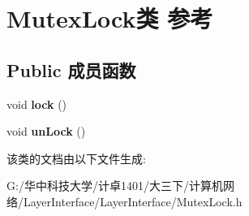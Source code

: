\hypertarget{class_mutex_lock}{}\section{Mutex\+Lock类 参考}
\label{class_mutex_lock}
\subsection*{Public 成员函数}
\begin{DoxyCompactItemize}
\item 
\mbox{\label{class_mutex_lock_a78d4fe5df4e15cffc2b647e7efb9a58a}} 
void {\bfseries lock} ()
\item 
\mbox{\label{class_mutex_lock_a442ba1ef110b2f08476a56fc68725668}} 
void {\bfseries un\+Lock} ()
\end{DoxyCompactItemize}


该类的文档由以下文件生成\+:\begin{DoxyCompactItemize}
\item 
G\+:/华中科技大学/计卓1401/大三下/计算机网络/\+Layer\+Interface/\+Layer\+Interface/Mutex\+Lock.\+h\end{DoxyCompactItemize}
